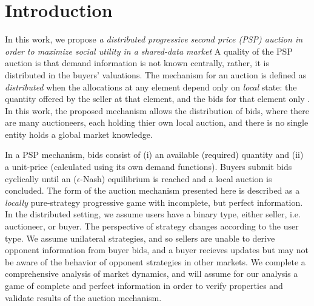 \documentclass[sigconf, anonymous]{acmart}
\theoremstyle{definition}
\begin{document}

\fi
\maketitle

\section{Introduction}

In this work, we propose \emph{a distributed progressive second price (PSP) auction in
order to maximize social utility in a shared-data market}
A quality of the PSP auction is that
demand information is not known centrally, rather, it is distributed in the
buyers' valuations. The mechanism for an auction is defined
as \emph{distributed} when the allocations at any element depend only on
\emph{local} state: the quantity offered by the seller at that element, and the
bids for that element only \cite{lazar}. In this work, the proposed mechanism
allows the distribution of bids, where there are many auctioneers, each holding
thier own local auction, and there is no single entity holds a global market knowledge.

In a PSP mechanism, bids consist of (i) an available (required) quantity and (ii) a unit-price (calculated
using its own demand functions). Buyers submit bids cyclically until an
($\epsilon$-Nash) equilibrium is reached and a local auction is concluded. 
The form of the auction mechanism presented here is described as a \emph{locally}
pure-strategy progressive game with incomplete, but perfect information.
In the distributed setting, we assume users have a binary type, either seller,
i.e. auctioneer, or buyer. The perspective of strategy changes according to the user
type. We assume unilateral strategies, and so sellers are unable to
derive opponent information from buyer bids, and a buyer recieves updates but
may not be aware of the behavior of opponent strategies in other markets.
We complete a comprehensive analysis of market dynamics, and will assume for
our analysis a game of complete and perfect information in order to verify
properties and validate results of the auction mechanism.
\end{document}
